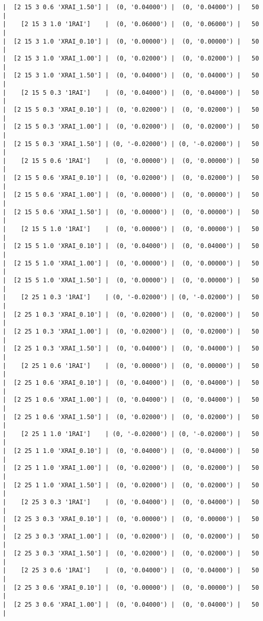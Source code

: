 \documentclass{article}
\begin{document}
\begin{verbatim}
|  [2 15 3 0.6 'XRAI_1.50'] |  (0, '0.04000') |  (0, '0.04000') |   50  |
|    [2 15 3 1.0 '1RAI']    |  (0, '0.06000') |  (0, '0.06000') |   50  |
|  [2 15 3 1.0 'XRAI_0.10'] |  (0, '0.00000') |  (0, '0.00000') |   50  |
|  [2 15 3 1.0 'XRAI_1.00'] |  (0, '0.02000') |  (0, '0.02000') |   50  |
|  [2 15 3 1.0 'XRAI_1.50'] |  (0, '0.04000') |  (0, '0.04000') |   50  |
|    [2 15 5 0.3 '1RAI']    |  (0, '0.04000') |  (0, '0.04000') |   50  |
|  [2 15 5 0.3 'XRAI_0.10'] |  (0, '0.02000') |  (0, '0.02000') |   50  |
|  [2 15 5 0.3 'XRAI_1.00'] |  (0, '0.02000') |  (0, '0.02000') |   50  |
|  [2 15 5 0.3 'XRAI_1.50'] | (0, '-0.02000') | (0, '-0.02000') |   50  |
|    [2 15 5 0.6 '1RAI']    |  (0, '0.00000') |  (0, '0.00000') |   50  |
|  [2 15 5 0.6 'XRAI_0.10'] |  (0, '0.02000') |  (0, '0.02000') |   50  |
|  [2 15 5 0.6 'XRAI_1.00'] |  (0, '0.00000') |  (0, '0.00000') |   50  |
|  [2 15 5 0.6 'XRAI_1.50'] |  (0, '0.00000') |  (0, '0.00000') |   50  |
|    [2 15 5 1.0 '1RAI']    |  (0, '0.00000') |  (0, '0.00000') |   50  |
|  [2 15 5 1.0 'XRAI_0.10'] |  (0, '0.04000') |  (0, '0.04000') |   50  |
|  [2 15 5 1.0 'XRAI_1.00'] |  (0, '0.00000') |  (0, '0.00000') |   50  |
|  [2 15 5 1.0 'XRAI_1.50'] |  (0, '0.00000') |  (0, '0.00000') |   50  |
|    [2 25 1 0.3 '1RAI']    | (0, '-0.02000') | (0, '-0.02000') |   50  |
|  [2 25 1 0.3 'XRAI_0.10'] |  (0, '0.02000') |  (0, '0.02000') |   50  |
|  [2 25 1 0.3 'XRAI_1.00'] |  (0, '0.02000') |  (0, '0.02000') |   50  |
|  [2 25 1 0.3 'XRAI_1.50'] |  (0, '0.04000') |  (0, '0.04000') |   50  |
|    [2 25 1 0.6 '1RAI']    |  (0, '0.00000') |  (0, '0.00000') |   50  |
|  [2 25 1 0.6 'XRAI_0.10'] |  (0, '0.04000') |  (0, '0.04000') |   50  |
|  [2 25 1 0.6 'XRAI_1.00'] |  (0, '0.04000') |  (0, '0.04000') |   50  |
|  [2 25 1 0.6 'XRAI_1.50'] |  (0, '0.02000') |  (0, '0.02000') |   50  |
|    [2 25 1 1.0 '1RAI']    | (0, '-0.02000') | (0, '-0.02000') |   50  |
|  [2 25 1 1.0 'XRAI_0.10'] |  (0, '0.04000') |  (0, '0.04000') |   50  |
|  [2 25 1 1.0 'XRAI_1.00'] |  (0, '0.02000') |  (0, '0.02000') |   50  |
|  [2 25 1 1.0 'XRAI_1.50'] |  (0, '0.02000') |  (0, '0.02000') |   50  |
|    [2 25 3 0.3 '1RAI']    |  (0, '0.04000') |  (0, '0.04000') |   50  |
|  [2 25 3 0.3 'XRAI_0.10'] |  (0, '0.00000') |  (0, '0.00000') |   50  |
|  [2 25 3 0.3 'XRAI_1.00'] |  (0, '0.02000') |  (0, '0.02000') |   50  |
|  [2 25 3 0.3 'XRAI_1.50'] |  (0, '0.02000') |  (0, '0.02000') |   50  |
|    [2 25 3 0.6 '1RAI']    |  (0, '0.04000') |  (0, '0.04000') |   50  |
|  [2 25 3 0.6 'XRAI_0.10'] |  (0, '0.00000') |  (0, '0.00000') |   50  |
|  [2 25 3 0.6 'XRAI_1.00'] |  (0, '0.04000') |  (0, '0.04000') |   50  |

\end{verbatim}
\end{document}
